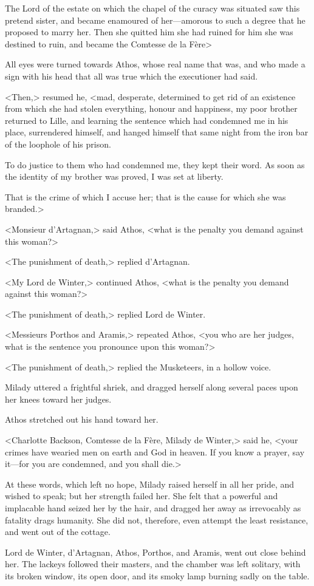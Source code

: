 The Lord of the estate on which the chapel of the curacy was situated saw this pretend sister, and became enamoured of her---amorous to such a degree that he proposed to marry her. Then she quitted him she had ruined for him she was destined to ruin, and became the Comtesse de la Fère\longdash> 

All eyes were turned towards Athos, whose real name that was, and who made a sign with his head that all was true which the executioner had said. 

<Then,> resumed he, <mad, desperate, determined to get rid of an existence from which she had stolen everything, honour and happiness, my poor brother returned to Lille, and learning the sentence which had condemned me in his place, surrendered himself, and hanged himself that same night from the iron bar of the loophole of his prison. 

To do justice to them who had condemned me, they kept their word. As soon as the identity of my brother was proved, I was set at liberty. 

That is the crime of which I accuse her; that is the cause for which she was branded.> 

<Monsieur d'Artagnan,> said Athos, <what is the penalty you demand against this woman?> 

<The punishment of death,> replied d'Artagnan. 

<My Lord de Winter,> continued Athos, <what is the penalty you demand against this woman?> 

<The punishment of death,> replied Lord de Winter. 

<Messieurs Porthos and Aramis,> repeated Athos, <you who are her judges, what is the sentence you pronounce upon this woman?> 

<The punishment of death,> replied the Musketeers, in a hollow voice. 

Milady uttered a frightful shriek, and dragged herself along several paces upon her knees toward her judges. 

Athos stretched out his hand toward her. 

<Charlotte Backson, Comtesse de la Fère, Milady de Winter,> said he, <your crimes have wearied men on earth and God in heaven. If you know a prayer, say it---for you are condemned, and you shall die.> 

At these words, which left no hope, Milady raised herself in all her pride, and wished to speak; but her strength failed her. She felt that a powerful and implacable hand seized her by the hair, and dragged her away as irrevocably as fatality drags humanity. She did not, therefore, even attempt the least resistance, and went out of the cottage. 

Lord de Winter, d'Artagnan, Athos, Porthos, and Aramis, went out close behind her. The lackeys followed their masters, and the chamber was left solitary, with its broken window, its open door, and its smoky lamp burning sadly on the table.